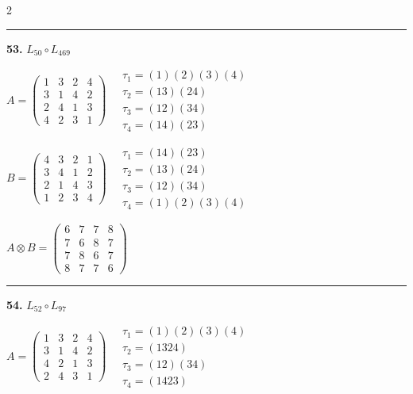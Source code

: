 \begin{multicols}{2}
\vspace{0.3em}
\hrule
\vspace{0.3em}

\noindent\textbf{53.} $L_{50} \circ L_{469}$

$A = \begin{pmatrix} 1 & 3 & 2 & 4 \\ 3 & 1 & 4 & 2 \\ 2 & 4 & 1 & 3 \\ 4 & 2 & 3 & 1 \end{pmatrix} \quad \begin{matrix} \tau_{1}=(1)(2)(3)(4) \\ \tau_{2}=(1 3)(2 4) \\ \tau_{3}=(1 2)(3 4) \\ \tau_{4}=(1 4)(2 3) \end{matrix}$

$B = \begin{pmatrix} 4 & 3 & 2 & 1 \\ 3 & 4 & 1 & 2 \\ 2 & 1 & 4 & 3 \\ 1 & 2 & 3 & 4 \end{pmatrix} \quad \begin{matrix} \tau_{1}=(1 4)(2 3) \\ \tau_{2}=(1 3)(2 4) \\ \tau_{3}=(1 2)(3 4) \\ \tau_{4}=(1)(2)(3)(4) \end{matrix}$

$A \otimes B = \begin{pmatrix} 6 & 7 & 7 & 8 \\ 7 & 6 & 8 & 7 \\ 7 & 8 & 6 & 7 \\ 8 & 7 & 7 & 6 \end{pmatrix}$

\vspace{0.3em}
\hrule
\vspace{0.3em}

\noindent\textbf{54.} $L_{52} \circ L_{97}$

$A = \begin{pmatrix} 1 & 3 & 2 & 4 \\ 3 & 1 & 4 & 2 \\ 4 & 2 & 1 & 3 \\ 2 & 4 & 3 & 1 \end{pmatrix} \quad \begin{matrix} \tau_{1}=(1)(2)(3)(4) \\ \tau_{2}=(1 3 2 4) \\ \tau_{3}=(1 2)(3 4) \\ \tau_{4}=(1 4 2 3) \end{matrix}$


\end{multicols}
